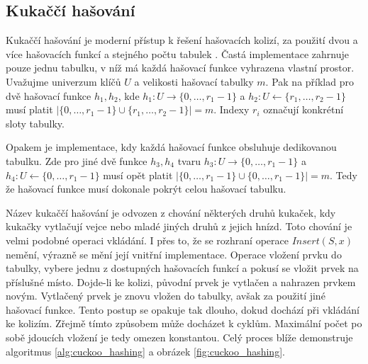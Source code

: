 \subsection{Kukaččí hašování}
Kukaččí hašování je moderní přístup k řešení hašovacích kolizí, za použití dvou a více hašovacích
funkcí a stejného počtu tabulek \cite{Cuckoo_hashing}. Častá implementace zahrnuje pouze jednu
tabulku, v níž má každá hašovací funkce vyhrazena vlastní prostor. Uvažujme univerzum klíčů $U$
a velikosti hašovací tabulky $m$. Pak na příklad pro dvě hašovací funkce 
$h_1, h_2$, kde $h_1 : U \rightarrow \{0,\ldots,r_1-1\}$ a $h_2 : U \leftarrow \{r_1,\ldots,r_2-1\}$ musí platit
$|\{0,\ldots,r_1-1\} \cup \{r_1,\ldots,r_2-1\}| = m$. Indexy $r_i$ označují konkrétní sloty tabulky.

Opakem je implementace, kdy každá hašovací funkce obsluhuje dedikovanou tabulku. Zde pro
jiné dvě funkce $h_3, h_4$ tvaru $h_3 : U \rightarrow \{0,\ldots,r_1-1\}$ a $h_4 : U \leftarrow \{0,\ldots,r_1-1\}$
musí opět platit $|\{0,\ldots,r_1-1\} \cup \{0,\ldots,r_1-1\}| = m$. Tedy že hašovací funkce musí dokonale pokrýt
celou hašovací tabulku.

Název kukaččí hašování je odvozen z chování některých druhů kukaček, kdy kukačky vytlačují vejce nebo mladé jiných druhů
z jejich hnízd. Toto chování je velmi podobné operaci vkládání. I přes to, že se rozhraní operace $Insert(S,x)$ nemění,
výrazně se mění její vnitřní implementace. Operace vložení prvku do tabulky, vybere jednu z dostupných hašovacích
funkcí a pokusí se vložit prvek na příslušné místo. Dojde-li ke kolizi, původní prvek je vytlačen a nahrazen prvkem novým.
Vytlačený prvek je znovu vložen do tabulky, avšak za použití jiné hašovací funkce. Tento postup se opakuje tak dlouho, dokud
dochází při vkládání ke kolizím. Zřejmě tímto způsobem může docházet k cyklům. Maximální počet po sobě jdoucích vložení je tedy
omezen konstantou. Celý proces blíže demonstruje algoritmus \ref{alg:cuckoo_hashing} a obrázek \ref{fig:cuckoo_hashing}.

